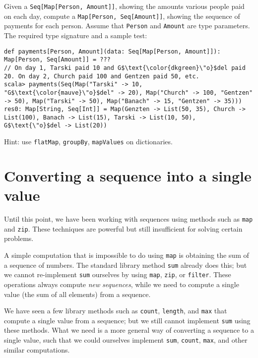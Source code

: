 Given a \lstinline!Seq[Map[Person, Amount]]!, showing the amounts
various people paid on each day, compute a \lstinline!Map[Person, Seq[Amount]]!,
showing the sequence of payments for each person. Assume that \lstinline!Person!
and \lstinline!Amount! are type parameters. The required type signature
and a sample test:
\begin{lstlisting}[mathescape=true]
def payments[Person, Amount](data: Seq[Map[Person, Amount]]): Map[Person, Seq[Amount]] = ???
// On day 1, Tarski paid 10 and G$\text{\color{dkgreen}\"o}$del paid 20. On day 2, Church paid 100 and Gentzen paid 50, etc.
scala> payments(Seq(Map("Tarski" -> 10, "G$\text{\color{mauve}\"o}$del" -> 20), Map("Church" -> 100, "Gentzen" -> 50), Map("Tarski" -> 50), Map("Banach" -> 15, "Gentzen" -> 35)))
res0: Map[String, Seq[Int]] = Map(Genzten -> List(50, 35), Church -> List(100), Banach -> List(15), Tarski -> List(10, 50), G$\text{\"o}$del -> List(20))
\end{lstlisting}

Hint: use \lstinline!flatMap!, \lstinline!groupBy!, \lstinline!mapValues!
on dictionaries.

\section{Converting a sequence into a single value}

Until this point, we have been working with sequences using methods
such as \lstinline!map! and \lstinline!zip!. These techniques are
powerful but still insufficient for solving certain problems.

A simple computation that is impossible to do using \lstinline!map!
is obtaining the sum of a sequence of numbers. The standard library
method \lstinline!sum! already does this; but we cannot re-implement
\lstinline!sum! ourselves by using \lstinline!map!, \lstinline!zip!,
or \lstinline!filter!. These operations always compute \emph{new}
\emph{sequences}, while we need to compute a single value (the sum
of all elements) from a sequence. 

We have seen a few library methods such as \lstinline!count!, \lstinline!length!,
and \lstinline!max! that compute a single value from a sequence;
but we still cannot implement \lstinline!sum! using these methods.
What we need is a more general way of converting a sequence to a single
value, such that we could ourselves implement \lstinline!sum!, \lstinline!count!,
\lstinline!max!, and other similar computations.

